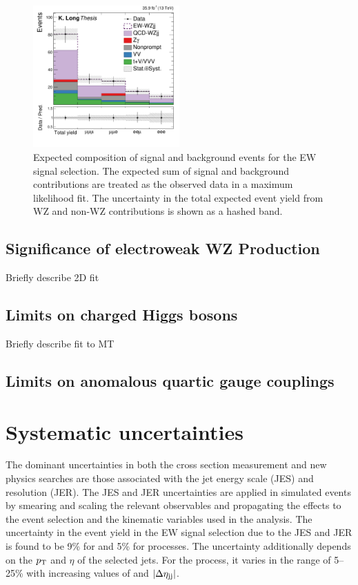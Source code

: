 \begin{figure}[htbp]
  \centering
   \includegraphics[width=0.5\textwidth]{figures/AnalysisProcedure/expectedYield_EWSignal.pdf}
  \caption{
    Expected composition of signal and background events for the EW signal selection.
    The expected sum of signal and background contributions are treated as the observed
    data in a maximum likelihood fit. The uncertainty in the total expected event yield
    from WZ and non-WZ contributions is shown as a hashed band.
        }
 \label{fig:expectedEWSignal}
\end{figure}

\subsection{Significance of electroweak WZ Production}
Briefly describe 2D fit
\subsection{Limits on charged Higgs bosons}
Briefly describe fit to MT
\subsection{Limits on anomalous quartic gauge couplings}

\section{Systematic uncertainties}

The dominant uncertainties in both the cross section measurement 
and new physics searches are those associated with 
the jet energy scale (JES) and resolution (JER).  The JES and JER 
uncertainties are applied in simulated events by smearing and 
scaling the relevant
observables and propagating the effects to the event selection and 
the kinematic variables used in the analysis.
The uncertainty in the event yield in the EW signal selection
due to the JES and JER 
is found to be 9\% for \QCDWZ and 5\% for \EWWZ processes.
The uncertainty additionally depends on the $p_{\mathrm{T}}$ and $\eta$ of the selected
jets. For the \QCDWZ process, it varies in the range of 5--25\% with
increasing values of {\mjj} and $\left|\Delta\eta_{\mathrm{jj}}\right|$.


